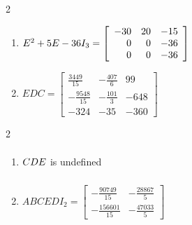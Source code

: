 \documentclass{ximera}
\begin{document}
\begin{multicols}{2} 
\begin{enumerate}
\setcounter{enumi}{\value{HW}}

\item  $E^2 + 5E-36I_{3} = \left[ \begin{array}{rrr} -30 & 20 & -15 \\ 0 & 0 & -36 \\ 0 & 0 & -36 \end{array} \right] \vphantom{\left[ \begin{array}{rrr} \frac{3449}{15} & -\frac{407}{6} & 99 \\  -\frac{9548}{15} & -\frac{101}{3} & -648 \\ -324 & -35 & -360 \end{array} \right]}$

\item $EDC = \left[ \begin{array}{rrr} \frac{3449}{15} & -\frac{407}{6} & 99 \\  -\frac{9548}{15} & -\frac{101}{3} & -648 \\ -324 & -35 & -360 \end{array} \right]$


\setcounter{HW}{\value{enumi}}
\end{enumerate}
\end{multicols}

\begin{multicols}{2} 
\begin{enumerate}
\setcounter{enumi}{\value{HW}}

\item $CDE \vphantom{\left[ \begin{array}{rr} -\frac{90749}{15} & -\frac{28867}{5} \\  -\frac{156601}{15} & -\frac{47033}{5} \end{array} \right]}$ is undefined

\item $ABCEDI_{2} = \left[ \begin{array}{rr} -\frac{90749}{15} & -\frac{28867}{5} \\  -\frac{156601}{15} & -\frac{47033}{5} \end{array} \right]$


\setcounter{HW}{\value{enumi}}
\end{enumerate}
\end{multicols}
\end{document}
